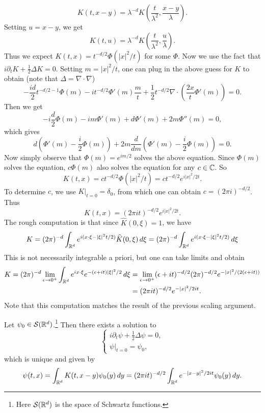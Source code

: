 \begin{example}
\begin{enumerate}
      \[
        K(t, x - y) = \lambda^{-d} K\left(\frac{t}{\lambda^2}, \frac{x - y}{\lambda}\right).
      \]
      Setting $u = x - y$, we get
      \[
        K(t, u) = \lambda^{-d} K\left(\frac{t}{\lambda^2}, \frac{u}{\lambda}\right).
      \]
      Thus we expect
      $K(t, x) = t^{-d / 2} \Phi(|x|^2 / t)$
      for some $\Phi$. Now we use the fact that
      $i \partial_t K + \frac{1}{2} \Delta K = 0$.
      Setting $m = |x|^2 / t$, one can
      plug in the above guess for $K$ to obtain
      (note that $\Delta = \nabla \cdot \nabla$)
      \[
        -\frac{id}{2} t^{-d / 2 - 1} \Phi(m)
        - it^{-d / 2} \Phi'(m) \frac{m}{t}
        + \frac{1}{2} t^{-d / 2} \nabla \cdot \left(\frac{2x}{t} \Phi'(m)\right) = 0.
      \]
      Then we get
      \[
        -i \frac{d}{2} \Phi(m) - im \Phi'(m)
        + d \Phi'(m) + 2m \Phi''(m) = 0,
      \]
      which gives
      \[
        d\left(\Phi'(m) - \frac{i}{2} \Phi(m)\right)
        + 2m \frac{d}{dm} \left(\Phi'(m) - \frac{i}{2}\Phi(m)\right) = 0.
      \]
      Now simply observe that
      $\Phi(m) = e^{im / 2}$ solves the above equation.
      Since $\Phi(m)$ solves the
      equation, $c \Phi(m)$ also solves the equation for
      any $c \in \mathbb{C}$. So
      \[
        K(t, x) = c t^{-d / 2} \Phi(|x|^2 / t)
        = c t^{-d / 2} e^{i|x|^2 / 2t}.
      \]
      To determine $c$, we use $K|_{t = 0} = \delta_0$,
      from which one can obtain $c = (2\pi i)^{-d / 2}$. Thus
      \[
        K(t, x) = (2\pi it)^{-d / 2} e^{i|x|^2 / 2t}.
      \]
      The rough computation is that since
      $\widehat{K}(0, \xi) = 1$, we have
      \[
        K = (2\pi)^{-d} \int_{\mathbb{R}^d} e^{i(x \cdot \xi - |\xi|^2 t / 2)} \widehat{K}(0, \xi)\, d\xi
        = (2\pi)^{-d} \int_{\mathbb{R}^d} e^{i(x \cdot \xi - |\xi|^2 t / 2)}\, d\xi
      \]
      This is not necessarily integrable a priori,
      but one can take limits and obtain
      \begin{align*}
        K
        = (2\pi)^{-d} \lim_{\epsilon \to 0^+}
        \int_{\mathbb{R}^d} e^{ix \cdot \xi} e^{-(\epsilon + it)|\xi|^2 / 2}\, d\xi
        &= \lim_{\epsilon \to 0^+} (\epsilon + it)^{-d / 2} (2\pi)^{-d / 2} e^{-|x|^2 / (2(\epsilon + it))} \\
        &= (2\pi it)^{-d / 2} e^{-|x|^2 / 2it}.
      \end{align*}
      Note that this computation matches the result
      of the previous scaling argument.
  \end{enumerate}
\end{example}

\begin{theorem}
  Let $\psi_0 \in \mathcal{S}(\mathbb{R}^d)$.\footnote{Here $\mathcal{S}(\mathbb{R}^d)$ is the space of Schwartz functions.}
  Then there exists a solution to
  \[
    \begin{cases}
      i \partial_t \psi + \frac{1}{2} \Delta \psi = 0, \\
      \psi|_{t = 0} = \psi_0,
    \end{cases}
  \]
  which is unique and given by
  \[
    \psi(t, x) = \int_{\mathbb{R}^d} K(t, x - y) \psi_0(y)\, dy
    = (2\pi it)^{-d / 2} \int_{\mathbb{R}^d} e^{-|x - y|^2 / 2it} \psi_0(y)\, dy.
  \]
\end{theorem}

